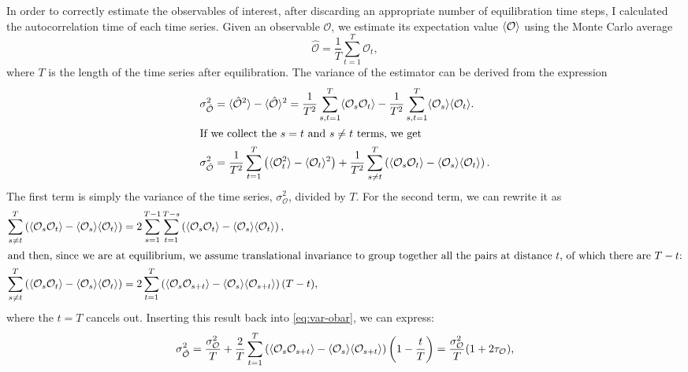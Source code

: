 In order to correctly estimate the observables of interest, after discarding an
appropriate number of equilibration time steps, I calculated the autocorrelation
time of each time series. Given an observable $\mathcal{O}$, we estimate its
expectation value $\langle\mathcal{O}\rangle$ using the Monte Carlo average
\begin{equation}
  \hat{\mathcal{O}} = \frac{1}{T} \sum_{t=1}^{T} \mathcal{O}_{t},
\end{equation}
where $T$ is the length of the time series after equilibration. The variance of
the estimator can be derived from the expression
\begin{align}
  \sigma_{\hat{\mathcal{O}}}^{2} &= \langle\hat{\mathcal{O}}^{2}\rangle -
  \langle\hat{\mathcal{O}}\rangle^{2} = \frac{1}{T^{2}} \sum_{s,t = 1}^{T}
  \langle\mathcal{O}_{s} \mathcal{O}_{t}\rangle - \frac{1}{T^{2}} \sum_{s,t = 1}^{T}
  \langle\mathcal{O}_{s}\rangle \langle\mathcal{O}_{t}\rangle. \label{eq:var-obar}
  \\
\intertext{If we collect the $s = t$ and $s \neq t$ terms, we get}
  \sigma_{\hat{\mathcal{O}}}^{2} &= \frac{1}{T^{2}} \sum_{t=1}^{T}
  \left(\langle\mathcal{O}_{t}^{2}\rangle - \langle\mathcal{O}_{t}\rangle^{2}\right) +
  \frac{1}{T^{2}} \sum_{s \neq t}^{T} \left(\langle\mathcal{O}_{s}
  \mathcal{O}_{t}\rangle - \langle\mathcal{O}_{s}\rangle \langle\mathcal{O}_{t}\rangle\right).
\end{align}
The first term is simply the variance of the time series,
$\sigma_{\mathcal{O}}^{2}$, divided by $T$. For the second term, we can rewrite
it as
\begin{align}
  \sum_{s \neq t}^{T} \left(\langle\mathcal{O}_{s} \mathcal{O}_{t}\rangle -
  \langle\mathcal{O}_{s}\rangle \langle\mathcal{O}_{t}\rangle\right) &= 2 \sum_{s = 1}^{T
  - 1} \sum_{t = 1}^{T - s} \left(\langle\mathcal{O}_{s} \mathcal{O}_{t}\rangle -
  \langle\mathcal{O}_{s}\rangle \langle\mathcal{O}_{t}\rangle\right), \\
\intertext{and then, since we are at equilibrium, we assume translational
invariance to group together all the pairs at distance $t$, of which there are
$T - t$:}
  \sum_{s \neq t}^{T} \left(\langle\mathcal{O}_{s} \mathcal{O}_{t}\rangle -
  \langle\mathcal{O}_{s}\rangle \langle\mathcal{O}_{t}\rangle\right) &=
  2 \sum_{t=1}^{T} \left(\langle\mathcal{O}_{s} \mathcal{O}_{s+t}\rangle -
  \langle\mathcal{O}_{s}\rangle \langle\mathcal{O}_{s+t}\rangle\right) (T - t),
\end{align}
where the $t = T$ cancels out. Inserting this result back into
\cref{eq:var-obar}, we can express:
\begin{equation}
  \sigma_{\hat{\mathcal{O}}}^{2} = \frac{\sigma_{\mathcal{O}}^{2}}{T} +
  \frac{2}{T} \sum_{t=1}^{T} \left(\langle\mathcal{O}_{s}
  \mathcal{O}_{s+t}\rangle - \langle\mathcal{O}_{s}\rangle
  \langle\mathcal{O}_{s+t}\rangle\right) \left(1 - \frac{t}{T}\right) 
  = \frac{\sigma_{\mathcal{O}}^{2}}{T} (1 + 2 \tau_{\mathcal{O}}),
  \label{eq:var-obar-final}
\end{equation}
